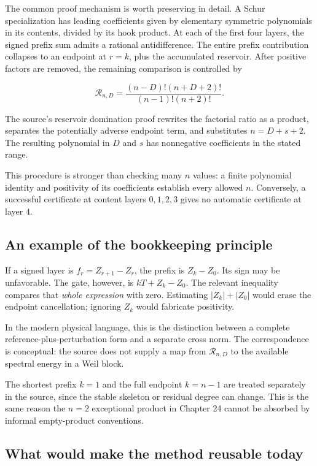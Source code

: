 \documentclass[
  10pt,
  a4paper,
  10pt,
  oneside,
  openany]{book}
\begin{document}
The common proof mechanism is worth preserving in detail. A Schur
specialization has leading coefficients given by elementary symmetric
polynomials in its contents, divided by its hook product. At each of the
first four layers, the signed prefix sum admits a rational
antidifference. The entire prefix contribution collapses to an endpoint
at \(r=k\), plus the accumulated reservoir. After positive factors are
removed, the remaining comparison is controlled by

\[
 \mathscr R_{n,D}
 =\frac{(n-D)!(n+D+2)!}{(n-1)!(n+2)!}.
 \tag{27.5}\label{eq:27.5}
\]

The source's reservoir domination proof rewrites the factorial ratio as
a product, separates the potentially adverse endpoint term, and
substitutes \(n=D+s+2\). The resulting polynomial in \(D\) and \(s\) has
nonnegative coefficients in the stated range.

This procedure is stronger than checking many \(n\) values: a finite
polynomial identity and positivity of its coefficients establish every
allowed \(n\). Conversely, a successful certificate at content layers
\(0,1,2,3\) gives no automatic certificate at layer \(4\).

\subsection{An example of the bookkeeping
principle}\label{an-example-of-the-bookkeeping-principle}

If a signed layer is \(f_r=Z_{r+1}-Z_r\), the prefix is \(Z_k-Z_0\). Its
sign may be unfavorable. The gate, however, is \(kT+Z_k-Z_0\). The
relevant inequality compares that \emph{whole expression} with zero.
Estimating \(|Z_k|+|Z_0|\) would erase the endpoint cancellation;
ignoring \(Z_k\) would fabricate positivity.

In the modern physical language, this is the distinction between a
complete reference-plus-perturbation form and a separate cross norm. The
correspondence is conceptual: the source does not supply a map from
\(\mathscr R_{n,D}\) to the available spectral energy in a Weil block.

The shortest prefix \(k=1\) and the full endpoint \(k=n-1\) are treated
separately in the source, since the stable skeleton or residual degree
can change. This is the same reason the \(n=2\) exceptional product in
Chapter 24 cannot be absorbed by informal empty-product conventions.

\subsection{What would make the method reusable
today}\label{what-would-make-the-method-reusable-today}
\end{document}
